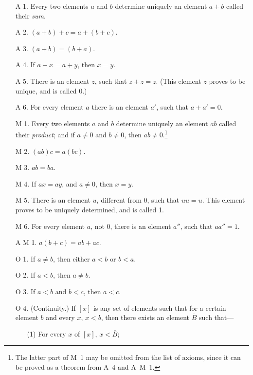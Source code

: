 \documentclass[a4paper,12pt]{book}[2004/02/16]
\theoremstyle{ilemma}
\theoremstyle{itheorem}
\theoremstyle{iother}
\theoremstyle{icorollary}
\theoremstyle{numcorollary}
\theoremstyle{idefinition}
\begin{document}
\begin{itemize}
\item[A 1.] Every two elements $a$ and $b$ determine uniquely an
element $a+b$ called their \emph{sum}.

\item[A 2.] $(a+b) + c = a + (b+c)$.

\item[A 3.] $(a+b)=(b+a)$.

\item[A 4.] If $a+x=a+y$, then $x=y$.

\item[A 5.] There is an element $z$, such that $z+z=z$. (This element
$z$ proves to be unique, and is called 0.)

\item[A 6.] For every element $a$ there is an element $a'$, such that
$a+a'=0$.

\item[M 1.] Every two elements $a$ and $b$ determine uniquely an
element $ab$ called their \emph{product}; and if $a \neq 0$ and $b
\neq 0$, then $ab \ne 0$.\footnote{%
    The latter part of M~1 may be omitted from the list of axioms, since
    it can be proved as a theorem from A~4 and A~M~1.}

\item[M 2.] $(ab)c=a(bc)$.

\item[M 3.] $ab = ba$.

\item[M 4.] If $ax=ay$, and $a \neq 0$, then $x=y$.
\item[M 5.] There is an element $u$, different from 0, such that
$uu=u$. This element proves to be uniquely determined, and is called
1.

\item[M 6.] For every element $a$, not 0, there is an element $a''$,
such that $aa'' = 1$.

\item[A M 1.] $a(b+c)=ab+ac$.

\item[O 1.] If $a \neq b$, then either $a<b$ or $b<a$.

\item[O 2.] If $a<b$, then $a \neq b$.

\item[O 3.] If $a<b$ and $b<c$, then $a<c$.

\item[O 4.] (Continuity.) If $[x]$ is any set of elements such that
for a certain element $b$ and every $x$, $x<b$, then there exists an
element $\overline{B}$ such that---
\begin{enumerate}
\item[(1)] For every $x$ of $[x]$, $x < \overline{B}$;


\end{enumerate}
\end{itemize}
\end{document}
